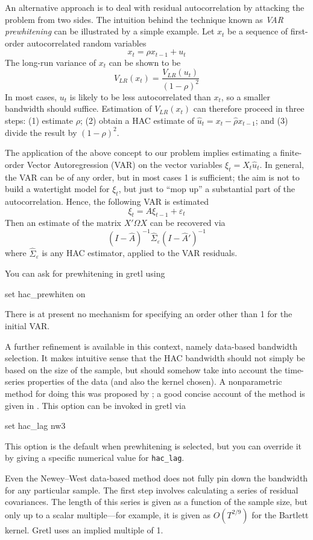 An alternative approach is to deal with residual autocorrelation by
attacking the problem from two sides. The intuition behind the
technique known as \emph{VAR prewhitening} \citep{andrews92}
can be illustrated by a simple example.  Let $x_t$ be a sequence of
first-order autocorrelated random variables
%
\[
  x_t = \rho x_{t-1} + u_t
\]
%
The long-run variance of $x_t$ can be shown to be
%
\[
  V_{LR}(x_t) = \frac{V_{LR}(u_t)}{(1-\rho)^2}
\]
%
In most cases, $u_t$ is likely to be less autocorrelated than $x_t$,
so a smaller bandwidth should suffice.  Estimation of $V_{LR}(x_t)$ can
therefore proceed in three steps: (1) estimate $\rho$; (2) obtain a
HAC estimate of $\hat{u}_t = x_t - \hat{\rho} x_{t-1}$; and (3)
divide the result by $(1-\rho)^2$.

The application of the above concept to our problem implies estimating
a finite-order Vector Autoregression (VAR) on the vector variables
$\xi_t = X_t \hat{u}_t$. In general, the VAR can be of any order, but
in most cases 1 is sufficient; the aim is not to build a watertight
model for $\xi_t$, but just to ``mop up'' a substantial part of the
autocorrelation.  Hence, the following VAR is estimated
%
\[
  \xi_t = A \xi_{t-1} + \varepsilon_t
\]
%
Then an estimate of the matrix $X'\Omega X$ can be recovered via
\[
  (I- \hat{A})^{-1} \hat{\Sigma}_{\varepsilon} (I- \hat{A}')^{-1}
\]
where $\hat{\Sigma}_{\varepsilon}$ is any HAC estimator, applied to the VAR
residuals.

You can ask for prewhitening in gretl using
%
\begin{code}
set hac_prewhiten on
\end{code}
%
There is at present no mechanism for specifying an order other than 1
for the initial VAR.

A further refinement is available in this context, namely data-based
bandwidth selection.  It makes intuitive sense that the HAC bandwidth
should not simply be based on the size of the sample, but should
somehow take into account the time-series properties of the data (and
also the kernel chosen).  A nonparametric method for doing this was
proposed by \cite{newey-west94}; a good concise account of the
method is given in \cite{hall05}.  This option can be invoked in gretl
via
%
\begin{code}
set hac_lag nw3
\end{code}
%
This option is the default when prewhitening is selected, but you can
override it by giving a specific numerical value for \verb|hac_lag|.

Even the Newey--West data-based method does not fully pin down the
bandwidth for any particular sample.  The first step involves
calculating a series of residual covariances.  The length of this
series is given as a function of the sample size, but only up to a
scalar multiple---for example, it is given as $O(T^{2/9})$ for the
Bartlett kernel. Gretl uses an implied multiple of 1.


